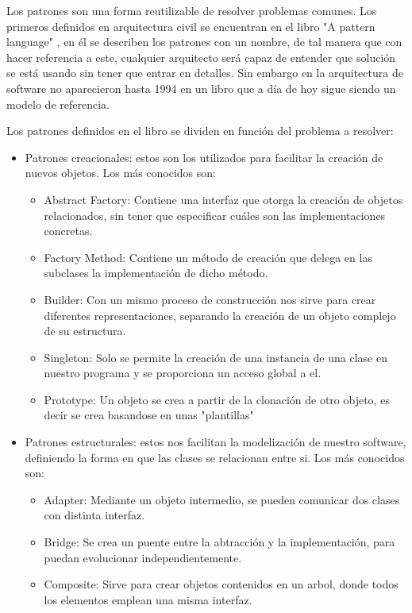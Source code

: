 \documentclass[12pt]{report} %
\begin{document}
	 Los patrones son una forma reutilizable de resolver problemas comunes. Los primeros definidos en arquitectura civil se encuentran en el libro "A pattern language" \cite{PatternLanguage}, en él se describen los patrones con un nombre, de tal manera que con hacer referencia a este, cualquier arquitecto será capaz de entender que solución se está usando sin tener que entrar en detalles. Sin embargo en la arquitectura de software no aparecieron hasta 1994 en un libro que a día de hoy sigue siendo un modelo de referencia\cite{gamma2002patrones}.
	 
	 Los patrones definidos en el libro \cite{gamma2002patrones} se dividen en función del problema a resolver:
	 
	 \begin{itemize}
	 	\item Patrones creacionales: estos son los utilizados para facilitar la creación de nuevos objetos. Los más conocidos son:	 	
	 	\begin{itemize}
	 		\item Abstract Factory: Contiene una interfaz que otorga la creación de objetos relacionados, sin tener que especificar cuáles son las implementaciones concretas.
	 		\item Factory Method: Contiene un método de creación que delega en las subclases la implementación de dicho método.
	 		\item Builder: Con un mismo proceso de construcción nos sirve para crear diferentes representaciones, separando la creación de un objeto complejo de su estructura.
	 		\item Singleton: Solo se permite la creación de una instancia de una clase en nuestro programa y se proporciona un acceso global a el.
	 		\item Prototype: Un objeto se crea a partir de la clonación de otro objeto, es decir se crea basandose en unas "plantillas"
	 	\end{itemize}
 	\item Patrones estructurales: estos nos facilitan la modelización de nuestro software, definiendo la forma en que las clases se relacionan entre si. Los más conocidos son:
 	\begin{itemize}
 		\item Adapter: Mediante un objeto intermedio, se pueden comunicar dos clases con distinta interfaz. 
 		\item Bridge: Se crea un puente entre la abtracción y la implementación, para puedan evolucionar independientemente.
 		\item Composite: Sirve para crear objetos contenidos en un arbol, donde todos los elementos emplean una misma interfaz.

\end{itemize}
\end{itemize}
\end{document}
